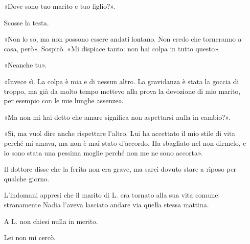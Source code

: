 «Dove sono tuo marito e tuo figlio?».

Scosse la testa.

«Non lo so, ma non possono essere andati lontano. Non credo che torneranno a casa, però». Sospirò.
«Mi dispiace tanto: non hai colpa in tutto questo».

«Neanche tu».

«Invece sì. La colpa è mia e di nessun altro. La gravidanza è stata la goccia di troppo, ma già da
molto tempo mettevo alla prova la devozione di mio marito, per esempio con le mie lunghe assenze».

«Ma non mi hai detto che amare significa non aspettarsi nulla in cambio?».

«Sì, ma vuol dire anche rispettare l'altro. Lui ha accettato il mio stile di vita perché mi amava,
ma non è mai stato d'accordo. Ha sbagliato nel non dirmelo, e io sono stata una pessima moglie
perché non me ne sono accorta».

Il dottore disse che la ferita non era grave, ma sarei dovuto stare a riposo per qualche giorno.

L'indomani appresi che il marito di L. era tornato alla sua vita comune: stranamente Nadia l'aveva
lasciato andare via quella stessa mattina.

A L. non chiesi nulla in merito.

Lei non mi cercò.
